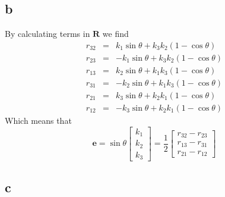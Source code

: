 \documentclass[11pt]{article}
\begin{document}
\subsection*{b}
By calculating terms in $\mathbf{R}$ we find
\begin{eqnarray*}
r_{32} &=&  k_1 \sin{\theta} + k_3 k_2 (1 - \cos{\theta}) \\
r_{23} &=& -k_1 \sin{\theta} + k_3 k_2 (1 - \cos{\theta}) \\
r_{13} &=&  k_2 \sin{\theta} + k_1 k_3 (1 - \cos{\theta}) \\
r_{31} &=& -k_2 \sin{\theta} + k_1 k_3 (1 - \cos{\theta}) \\
r_{21} &=&  k_3 \sin{\theta} + k_2 k_1 (1 - \cos{\theta}) \\
r_{12} &=& -k_3 \sin{\theta} + k_2 k_1 (1 - \cos{\theta})
\end{eqnarray*}
Which means that
\[\mathbf{e} = 
\sin{\theta} 
\begin{bmatrix}
k_1 \\
k_2 \\
k_3
\end{bmatrix}
=
\frac{1}{2}
\begin{bmatrix}
r_{32} - r_{23} \\
r_{13} - r_{31} \\
r_{21} - r_{12}
\end{bmatrix}
\]


\subsection*{c}
\end{document}
